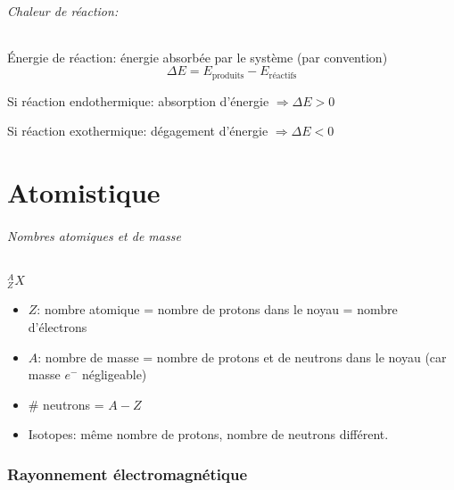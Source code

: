 \paragraph{Chaleur de réaction:}
\'Energie de réaction: énergie absorbée par le système (par convention)
$$\Delta E = E_{\textrm{produits}}-E_{\textrm{réactifs}}$$

Si réaction endothermique: absorption d'énergie $\Rightarrow \Delta E > 0$

Si réaction exothermique: dégagement d'énergie $\Rightarrow  \Delta E < 0$

\part{Atomistique}



\paragraph{Nombres atomiques et de masse}

\emph{$^{A}_{Z}X$}
\begin{itemize}
	\item $Z$: nombre atomique = nombre de protons dans le noyau = nombre d'électrons
	\item $A$: nombre de masse = nombre de protons et de neutrons dans le noyau (car masse $e^{-}$ négligeable)
	\item \# neutrons = $A-Z$
	\item Isotopes: même nombre de protons, nombre de neutrons différent.
\end{itemize}

\section{Rayonnement électromagnétique}

